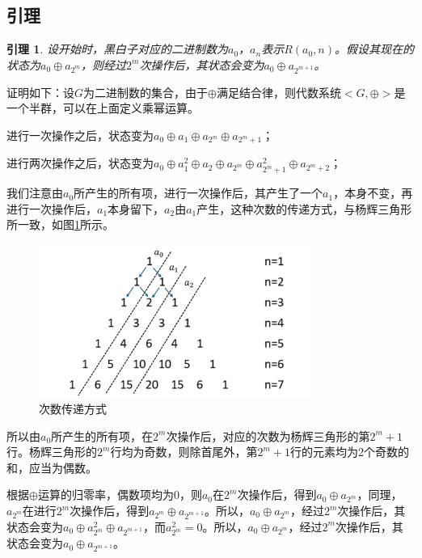 \documentclass[12pt,AutoFakeSlant,AutoFakeBold]{article}
\newtheorem{lemma}{引理}
\newcommand{\nor}{\oplus}
\begin{document}
\subsection{引理}

\begin{lemma}
    设开始时，黑白子对应的二进制数为$a_0$，$a_n$表示$R(a_0,n)$。假设其现在的状态为$a_0\nor a_{2^m}$，则经过$2^m$次操作后，其状态会变为$a_0\nor a_{2^{m+1}}$。
\end{lemma}

证明如下：设$G$为二进制数的集合，由于$\nor$满足结合律，则代数系统$<G,\nor>$是一个半群，可以在上面定义乘幂运算。
\begin{itemize*}
    \item 进行一次操作之后，状态变为$a_0\nor a_1 \nor a_{2^m} \nor a_{2^m+1}$；
    \item 进行两次操作之后，状态变为$a_0\nor a_1^2 \nor a_2 \nor a_{2^m} \nor a_{2^m+1}^2 \nor a_{2^m+2}$；
\end{itemize*}

我们注意由$a_0$所产生的所有项，进行一次操作后，其产生了一个$a_1$，本身不变，再进行一次操作后，$a_1$本身留下，$a_2$由$a_1$产生，这种次数的传递方式，与杨辉三角形所一致，如图\ref{fig:杨辉三角}所示。

\begin{figure}[!ht]
    \centering
    \includegraphics[width=0.8\textwidth]{图片1.png}
    \caption{次数传递方式}
    \label{fig:杨辉三角}
\end{figure}

所以由$a_0$所产生的所有项，在$2^m$次操作后，对应的次数为杨辉三角形的第$2^m+1$行。杨辉三角形的$2^m$行均为奇数\cite{hinz1992pascal}，则除首尾外，第$2^m+1$行的元素均为2个奇数的和，应当为偶数。

根据$\nor$运算的归零率，偶数项均为0，则$a_0$在$2^m$次操作后，得到$a_0\nor a_{2^m}$，同理，$a_{2^m}$在进行$2^m$次操作后，得到$a_{2^m}\nor a_{2^{m+1}}$。所以，$a_0\nor a_{2^m}$，经过$2^m$次操作后，其状态会变为$a_0\nor a_{2^m}^2 \nor a_{2^{m+1}}$，而$a_{2^m}^2=0$。所以，$a_0\nor a_{2^m}$，经过$2^m$次操作后，其状态会变为$a_0\nor a_{2^{m+1}}$。
\end{document}
